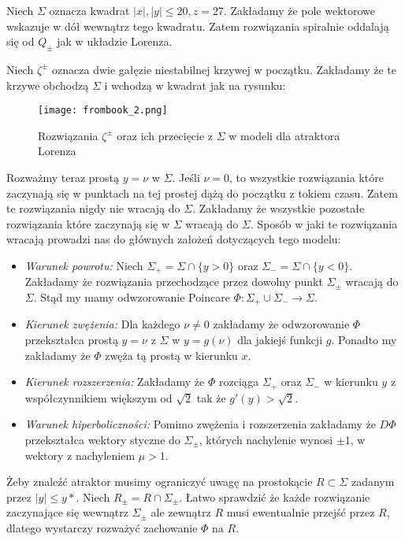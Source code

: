 \documentclass[12pt]{report}
\begin{document}
	\par Niech $\Sigma$ oznacza kwadrat $\lvert x \rvert, \lvert y \rvert \le 20, z = 27$. Zakładamy że pole wektorowe wskazuje w dół wewnątrz tego kwadratu. Zatem rozwiązania spiralnie oddalają się od $Q_{\pm}$ jak w układzie Lorenza.
	\par Niech $\zeta^{\pm}$ oznacza dwie gałęzie niestabilnej krzywej w początku. Zakładamy że te krzywe obchodzą $\Sigma$ i wchodzą w kwadrat jak na rysunku:
	\begin{figure}[H]
		\centering
		\texttt{[image: frombook\_2.png]}
		\caption{Rozwiązania $\zeta^{\pm}$ oraz ich przecięcie z $\Sigma$ w modeli dla atraktora Lorenza}
		\label{fig:frombook_2}
	\end{figure}
	\par Rozważmy teraz prostą $y = \nu$ w $\Sigma$. Jeśli $\nu = 0$, to wszystkie rozwiązania które zaczynają się w punktach na tej prostej dążą do początku z tokiem czasu. Zatem te rozwiązania nigdy nie wracają do $\Sigma$. Zakładamy że wszystkie pozostałe rozwiązania które zaczynają się w $\Sigma$ wracają do $\Sigma$. Sposób w jaki te rozwiązania wracają prowadzi nas do głównych założeń dotyczących tego modelu:
	\begin{itemize}
		\item \textit{Warunek powrotu:} Niech $\Sigma_+ = \Sigma \cap \{y > 0\}$ oraz $\Sigma_- = \Sigma \cap \{y < 0\}$. Zakładamy że rozwiązania przechodzące przez dowolny punkt $\Sigma_{\pm}$ wracają do $\Sigma$. Stąd my mamy odwzorowanie Poincare $\Phi: \Sigma_+ \cup \Sigma_- \to \Sigma$.
		\item \textit{Kierunek zwężenia:} Dla każdego $\nu \ne 0$ zakładamy że odwzorowanie $\Phi$ przekształca prostą $y = \nu$ z $\Sigma$ w $y = g(\nu)$ dla jakiejś funkcji $g$. Ponadto my zakładamy że $\Phi$ zwęża tą prostą w kierunku $x$.
		\item \textit{Kierunek rozszerzenia:} Zakładamy że $\Phi$ rozciąga $\Sigma_+$ oraz $\Sigma_-$ w kierunku $y$ z współczynnikiem większym od $\sqrt{2}$ tak że $g'(y) > \sqrt{2}$.
		\item \textit{Warunek hiperboliczności:} Pomimo zwężenia i rozszerzenia zakładamy że $D\Phi$ przekształca wektory styczne do $\Sigma_{\pm}$, których nachylenie wynosi $\pm 1$, w wektory z nachyleniem $\mu > 1$.
	\end{itemize}
	\par Żeby znaleźć atraktor musimy ograniczyć uwagę na prostokącie $R \subset \Sigma$ zadanym przez $\lvert y \rvert \le y*$. Niech $R_{\pm} = R \cap \Sigma_{\pm}$. Łatwo sprawdzić że każde rozwiązanie zaczynające się wewnątrz $\Sigma_{\pm}$ ale zewnątrz $R$ musi ewentualnie przejść przez $R$, dlatego wystarczy rozważyć zachowanie $\Phi$ na $R$.
\end{document}
